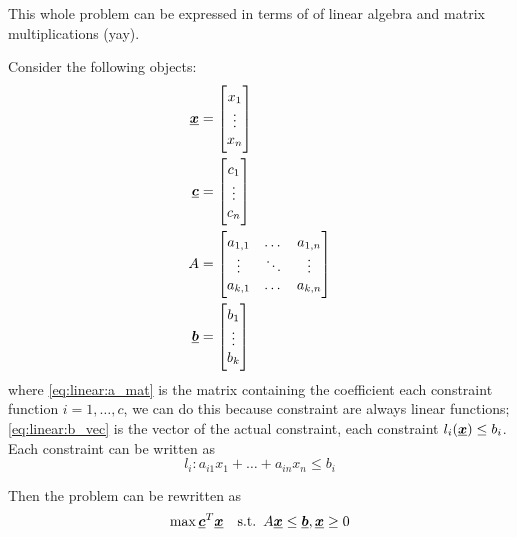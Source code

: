 \documentclass[12pt]{extarticle}
\renewcommand{\vec}[1]{\uvec{#1}}
\begin{document}
This whole problem can be expressed in terms of of linear algebra and matrix multiplications (yay).

Consider the following objects:
\begin{align}
    \vec x & = \begin{bmatrix}
                   x_1    \\
                   \vdots \\
                   x_n
               \end{bmatrix}                        \\
    \vec c & = \begin{bmatrix}
                   c_1    \\
                   \vdots \\
                   c_n
               \end{bmatrix}                        \\
    A      & = \begin{bmatrix}
                   a_{1,1} & \dots  & a_{1, n} \\
                   \vdots  & \ddots & \vdots   \\
                   a_{k,1} & \dots  & a_{k, n} \\
               \end{bmatrix} \label{eq:linear:a_mat} \\
    \vec b & = \begin{bmatrix}
                   b_1    \\
                   \vdots \\
                   b_k
               \end{bmatrix} \label{eq:linear:b_vec}
\end{align}
where \autoref{eq:linear:a_mat} is the matrix containing the coefficient each constraint function $i = 1, \ldots, c$, we can do this because constraint are always linear functions;
\autoref{eq:linear:b_vec} is the vector of the actual constraint, each constraint $l_i(\vec{x}) \leq b_i$.
Each constraint can be written as
\begin{equation}
    \label{eq:linear:constraint}
    l_i: a_{i1} x_1 + \dots + a_{in} x_n \leq b_i
\end{equation}

Then the problem can be rewritten as
\begin{equation}
    \max \vec c^T \vec x \quad \text{s.t.} \enspace A \vec x \leq \vec b, \vec x \geq 0
\end{equation}
\end{document}
